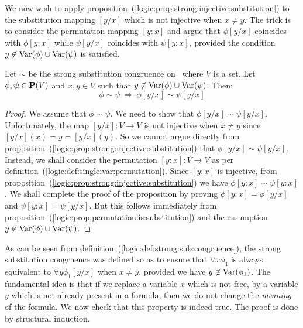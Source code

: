 We now wish to apply
proposition~(\ref{logic:prop:strong:injective:substitution}) to the
substitution mapping $[y/x]$ which is not injective when $x\neq y$.
The trick is to consider the permutation mapping $[y\!:\!x]$ and
argue that $\phi[y/x]$ coincides with $\phi[y\!:\!x]$ while
$\psi[y/x]$ coincides with $\psi[y\!:\!x]$, provided the condition
$y\not\in\mbox{\rm Var}(\phi)\cup\mbox{\rm Var}(\psi)$ is satisfied.
\begin{prop}\label{logic:prop:substitution:single:var}
Let $\sim$ be the strong substitution congruence on \pv\ where $V$
is a set. Let $\phi,\psi\in\mbox{${\bf P}(V)$}$ and $x,y\in V$ such that
$y\not\in\mbox{\rm Var}(\phi)\cup\mbox{\rm Var}(\psi)$. Then:
    \[
    \phi\sim\psi\ \Rightarrow\ \phi[y/x]\sim\psi[y/x]
    \]
\end{prop}
\begin{proof}
We assume that $\phi\sim\psi$. We need to show that
$\phi[y/x]\sim\psi[y/x]$. Unfortunately, the map $[y/x]:V\to V$ is
not injective when $x\neq y$ since $[y/x](x)=y=[y/x](y)$. So we
cannot argue directly from
proposition~(\ref{logic:prop:strong:injective:substitution}) that
$\phi[y/x]\sim\psi[y/x]$. Instead, we shall consider the permutation
$[y\!:\!x]:V\to V$ as per
definition~(\ref{logic:def:single:var:permutation}). Since
$[y\!:\!x]$ is injective, from
proposition~(\ref{logic:prop:strong:injective:substitution}) we have
$\phi[y\!:\!x]\sim\psi[y\!:\!x]$. We shall complete the proof of the
proposition by proving $\phi[y\!:\!x]=\phi[y/x]$ and
$\psi[y\!:\!x]=\psi[y/x]$. But this follows immediately from
proposition~(\ref{logic:prop:permutation:is:substitution}) and the
assumption $y\not\in\mbox{\rm Var}(\phi)\cup\mbox{\rm Var}(\psi)$.
\end{proof}

As can be seen from
definition~(\ref{logic:def:strong:sub:congruence}), the strong
substitution congruence was defined so as to ensure that $\forall
x\phi_{1}$ is always equivalent to $\forall y\phi_{1}[y/x]$ when
$x\neq y$, provided we have $y\not\in\mbox{\rm Var}(\phi_{1})$. The
fundamental idea is that if we replace a variable $x$ which is not
free, by a variable $y$ which is not already present in a formula,
then we do not change the {\em meaning} of the formula. We now check
that this property is indeed true. The proof is done by structural
induction.


